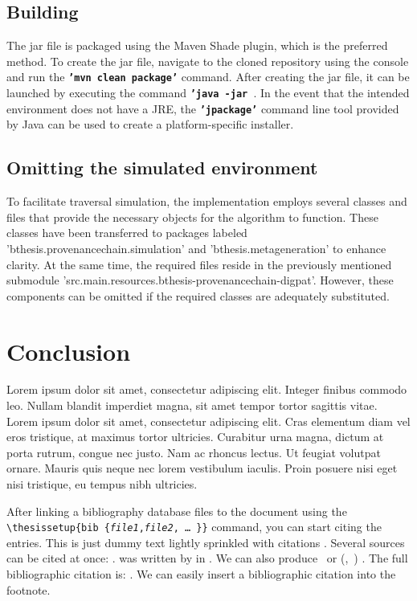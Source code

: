 \documentclass[
  digital,     %
  oneside,     %
  nosansbold,  %
  nocolorbold, %
  lof,         %
  lot,         %
]{fithesis4}
\begin{document}
\section{Building}
The jar file is packaged using the Maven Shade plugin, which is the preferred method. To create the jar file, navigate to the cloned repository using the console and run the \textbf{\texttt{'mvn clean package'}} command. After creating the jar file, it can be launched by executing the command \textbf{\texttt{'java -jar }}. In the event that the intended environment does not have a JRE, the \textbf{\texttt{'jpackage'}} command line tool provided by Java can be used to create a platform-specific installer.

\section{Omitting the simulated environment}
To facilitate traversal simulation, the implementation employs several classes and files that provide the necessary objects for the algorithm to function. These classes have been transferred to packages labeled 'bthesis.provenancechain.simulation' and 'bthesis.metageneration' to enhance clarity. At the same time, the required files reside in the previously mentioned submodule 'src.main.resources.bthesis-provenancechain-digpat'. However, these components can be omitted if the required classes are adequately substituted.
\shorthandon{-}


\chapter*{Conclusion}
\shorthandoff{-}
Lorem ipsum dolor sit amet, consectetur adipiscing elit. Integer finibus commodo leo. Nullam blandit imperdiet magna, sit amet tempor tortor sagittis vitae. Lorem ipsum dolor sit amet, consectetur adipiscing elit. Cras elementum diam vel eros tristique, at maximus tortor ultricies. Curabitur urna magna, dictum at porta rutrum, congue nec justo. Nam ac rhoncus lectus. Ut feugiat volutpat ornare. Mauris quis neque nec lorem vestibulum iaculis. Proin posuere nisi eget nisi tristique, eu tempus nibh ultricies.
\shorthandon{-}

After linking a bibliography data\-base files to the document using
the \verb"\"\texttt{thesis\discretionary{-}{}{}setup\{bib\discretionary{=}{=}{=}%
\{\textit{file1},\textit{file2},\,\ldots\,\}\}} command, you can
start citing the entries. This is just dummy text
\parencite{borgman03} lightly sprinkled with citations
\parencite[p.~123]{greenberg98}. Several sources can be cited at
once: \cite{borgman03,greenberg98,thanh01}.
 was written by \citeauthor{greenberg98} in
\citeyear{greenberg98}. We can also produce \textcite{greenberg98}%
\ or %
\def\citeauthoryear#1{(\textcite{#1},~\citeyear{#1})}%
\citeauthoryear{greenberg98}%
. The full bibliographic citation is:
\emph{}. We can easily insert a bibliographic
citation into the footnote.

\printbibliography[heading=bibintoc]
\end{document}

